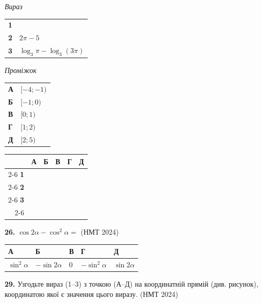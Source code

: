 \documentclass[14pt]{extarticle}
\newcommand{\answerTableTall}[5]{
\begin{center}
\begin{tabular}{|*{5}{>{\centering\arraybackslash}m{2.8cm}|}}
\hline
\rule[-0.3cm]{0pt}{0.8cm}\textbf{А} & \textbf{Б} & \textbf{В} & \textbf{Г} & \textbf{Д} \\
\hline
\rule[-0.9cm]{0pt}{2.0cm}#1 & 
\rule[-0.9cm]{0pt}{2.0cm}#2 & 
\rule[-0.9cm]{0pt}{2.0cm}#3 & 
\rule[-0.9cm]{0pt}{2.0cm}#4 & 
\rule[-0.9cm]{0pt}{2.0cm}#5 \\
\hline
\end{tabular}
\end{center}
}
\newcommand{\answerGrid}{
    \begingroup
    \renewcommand{\arraystretch}{1.3} 
    \setlength{\tabcolsep}{7pt} 
    \begin{tabular}{r|c|c|c|c|c|}
         \multicolumn{1}{c}{} & \multicolumn{1}{c}{\textbf{А}} & \multicolumn{1}{c}{\textbf{Б}} & \multicolumn{1}{c}{\textbf{В}} & \multicolumn{1}{c}{\textbf{Г}} & \multicolumn{1}{c}{\textbf{Д}} \\ \cline{2-6}
         \textbf{1} & & & & & \\ \cline{2-6}
         \textbf{2} & & & & & \\ \cline{2-6}
         \textbf{3} & & & & & \\ \cline{2-6}
    \end{tabular}
    \endgroup
}
\newcommand{\matchingLayout}[3]{
    \noindent
    \begin{minipage}[t]{0.40\textwidth}
       
        #1
    \end{minipage}%
    \hfill
    \begin{minipage}[t]{0.28\textwidth}
        
        #2
    \end{minipage}%
    \hfill
    \begin{minipage}[t]{0.30\textwidth}
        \vspace{0pt} %
        \begin{flushright}
        #3
        \end{flushright}
    \end{minipage}
}
\newcommand{\nmtyear}[1]{\hfill{\small\color{yearcolor}(НМТ #1)}}
\begin{document}
\matchingLayout{
    \textit{Вираз} \par \vspace{0.2cm}
    \begin{tabular}{@{}p{0.5cm} l@{}}
    \textbf{1} & \trigStyle{$\cos \dfrac{\pi}{3}$} \\[0.4cm]
    \textbf{2} & $2\pi - 5$ \\[0.4cm]
    \textbf{3} & $\log_3 \pi - \log_3 (3\pi)$ \\
    \end{tabular}
}{
    \textit{Проміжок} \par \vspace{0.2cm}
    \begin{tabular}{@{}p{0.5cm} l@{}}
    \textbf{А} & $[-4; -1)$ \\[0.2cm]
    \textbf{Б} & $[-1; 0)$ \\[0.2cm]
    \textbf{В} & $[0; 1)$ \\[0.2cm]
    \textbf{Г} & $[1; 2)$ \\[0.2cm]
    \textbf{Д} & $[2; 5)$ \\
    \end{tabular}
}{
    \answerGrid
}

\vspace{0.7cm}

\noindent\textbf{26.} $\cos 2\alpha - \cos^2 \alpha = $ \nmtyear{2024}


\vspace{0.3cm}
\answerTableTall{$\sin^2 \alpha$}{$-\sin 2\alpha$}{$0$}{$-\sin^2 \alpha$}{$\sin 2\alpha$}


\noindent\textbf{29.} Узгодьте вираз (1--3) з точкою (А--Д) на координатній прямій (див. рисунок), координатою якої є значення цього виразу. \nmtyear{2024}

\begin{center}
\end{center}

\vspace{0.3cm}
\end{document}
